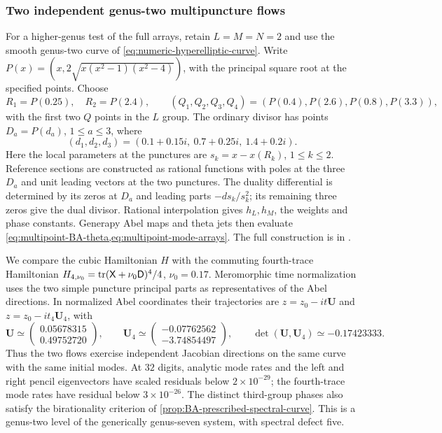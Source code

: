 \subsubsection{Two independent genus-two multipuncture flows}
\label{sec:numeric-multipoint-genus2}

For a higher-genus test of the full arrays, retain $L=M=N=2$ and
use the smooth genus-two curve of
\cref{eq:numeric-hyperelliptic-curve}. Write
$P(x)=(x,2\sqrt{x(x^2-1)(x^2-4)})$, with the principal square root
at the specified points. Choose
\[
 R_1=P(0.25),\quad R_2=P(2.4),\qquad
 (Q_1,Q_2,Q_3,Q_4)=(P(0.4),P(2.6),P(0.8),P(3.3)),
\]
with the first two $Q$ points in the $L$ group. The ordinary divisor
has points $D_a=P(d_a)$, $1\leq a\leq3$, where
\[
 (d_1,d_2,d_3)=(0.1+0.15i,\ 0.7+0.25i,\ 1.4+0.2i).
\]
Here the local parameters at the punctures are $s_k=x-x(R_k)$,
$1\leq k\leq2$. Reference sections are constructed as rational functions with poles
at the three $D_a$ and unit leading vectors at the two punctures.
The duality differential is determined by its zeros at $D_a$ and
leading parts $-ds_k/s_k^2$; its remaining three zeros give the dual
divisor. Rational interpolation gives $h_L,h_M$, the weights and
phase constants. Generapy Abel maps and theta jets then evaluate
\cref{eq:multipoint-BA-theta,eq:multipoint-mode-arrays}. The full
construction is in .

We compare the cubic Hamiltonian $H$ with the commuting fourth-trace
Hamiltonian $H_{4,\nu_0}=\operatorname{tr}(\mathsf X+\nu_0\mathsf D)^4/4$,
$\nu_0=0.17$. Meromorphic time normalization uses the two simple
puncture principal parts as representatives of the Abel directions.
In normalized Abel coordinates their trajectories are
$z=z_0-it\boldsymbol U$ and $z=z_0-it_4\boldsymbol U_4$, with
\[
 \boldsymbol U\simeq
 \begin{pmatrix}0.05678315\\0.49752720\end{pmatrix},\qquad
 \boldsymbol U_4\simeq
 \begin{pmatrix}-0.07762562\\-3.74854497\end{pmatrix},\qquad
 \det(\boldsymbol U,\boldsymbol U_4)\simeq-0.17423333.
\]
Thus the two flows exercise independent Jacobian directions on the
same curve with the same initial modes. At $32$ digits, analytic
mode rates and the left and right pencil eigenvectors have scaled
residuals below $2\times10^{-29}$; the fourth-trace mode rates have
residual below $3\times10^{-26}$. The distinct third-group phases
also satisfy the birationality criterion of
\cref{prop:BA-prescribed-spectral-curve}. This is a genus-two level
of the generically genus-seven system, with spectral defect five.

